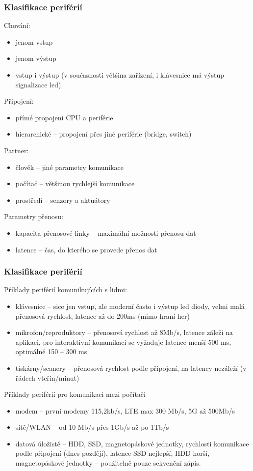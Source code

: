 \documentclass{beamer}
\begin{document}
\begin{frame}
\frametitle{Klasifikace periférií}
Chování:
\begin{itemize}
\item jenom vstup
\item jenom výstup
\item vstup i výstup (v současnosti většina zařízení, i klávesnice má výstup signalizace led)
\end{itemize}

Připojení:
\begin{itemize}
\item přímé propojení CPU a periférie
\item hierarchické -- propojení přes jiné periférie (bridge, switch)
\end{itemize}

Partner:
\begin{itemize}
\item člověk -- jiné parametry komunikace
\item počítač -- většinou rychlejší komunikace
\item prostředí -- senzory a aktuátory
\end{itemize}

Parametry přenosu:
\begin{itemize}
\item kapacita přenosové linky -- maximální možnosti přenosu dat
\item latence -- čas, do kterého se provede přenos dat
\end{itemize}
\end{frame}

\begin{frame}
\frametitle{Klasifikace periférií}

Příklady periférií komunikujících s lidmi:
\begin{itemize}
\item klávesnice -- sice jen vstup, ale moderní často i výstup led diody, velmi malá přenosová rychlost, latence až do 200ms (mimo hraní her) 
\item mikrofon/reproduktory -- přenosová rychlost až 8Mb/s, latence záleží na aplikaci, pro interaktivní komunikaci se vyžaduje latence menší 500 ms, optimálně 150 -- 300 ms 
\item tiskárny/scanery -- přenosová rychlost podle připojení, na latency nezáleží (v řádech vteřin/minut)
\end{itemize}

Příklady periférií pro komunikaci mezi počítači
\begin{itemize}
\item modem -- první modemy 115,2kb/s, LTE max 300 Mb/s, 5G až 500Mb/s
\item sítě/WLAN -- od 10 Mb/s přes 1Gb/s až po 1Tb/s
\item datová úložistě -- HDD, SSD, magnetopáskové jednotky, rychlosti komunikace podle připojení (dnes později), latence SSD nejlepší, HDD horší, magnetopáskové jednotky -- použitelně pouze sekvenční zápis.
\end{itemize}

\end{frame}
\end{document}
